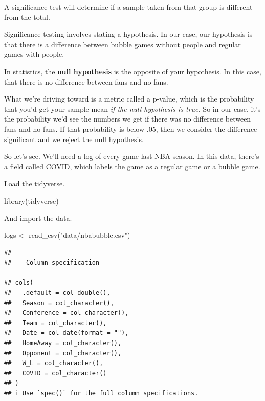\documentclass[
]{book}
\newenvironment{Shaded}{\begin{snugshade}}{\end{snugshade}}
\newcommand{\FunctionTok}[1]{\textcolor[rgb]{0.00,0.00,0.00}{#1}}
\newcommand{\NormalTok}[1]{#1}
\newcommand{\OtherTok}[1]{\textcolor[rgb]{0.56,0.35,0.01}{#1}}
\newcommand{\StringTok}[1]{\textcolor[rgb]{0.31,0.60,0.02}{#1}}
\begin{document}
A significance test will determine if a sample taken from that group is different from the total.

Significance testing involves stating a hypothesis. In our case, our hypothesis is that there is a difference between bubble games without people and regular games with people.

In statistics, the \textbf{null hypothesis} is the opposite of your hypothesis. In this case, that there is no difference between fans and no fans.

What we're driving toward is a metric called a p-value, which is the probability that you'd get your sample mean \emph{if the null hypothesis is true.} So in our case, it's the probability we'd see the numbers we get if there was no difference between fans and no fans. If that probability is below .05, then we consider the difference significant and we reject the null hypothesis.

So let's see. We'll need a log of every game last NBA season. In this data, there's a field called COVID, which labels the game as a regular game or a bubble game.

Load the tidyverse.

\begin{Shaded}
\begin{Highlighting}[]
\FunctionTok{library}\NormalTok{(tidyverse)}
\end{Highlighting}
\end{Shaded}

And import the data.

\begin{Shaded}
\begin{Highlighting}[]
\NormalTok{logs }\OtherTok{\textless{}{-}} \FunctionTok{read\_csv}\NormalTok{(}\StringTok{"data/nbabubble.csv"}\NormalTok{)}
\end{Highlighting}
\end{Shaded}

\begin{verbatim}
## 
## -- Column specification --------------------------------------------------------
## cols(
##   .default = col_double(),
##   Season = col_character(),
##   Conference = col_character(),
##   Team = col_character(),
##   Date = col_date(format = ""),
##   HomeAway = col_character(),
##   Opponent = col_character(),
##   W_L = col_character(),
##   COVID = col_character()
## )
## i Use `spec()` for the full column specifications.
\end{verbatim}
\end{document}
